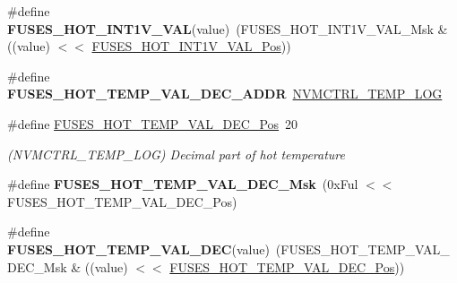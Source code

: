 \begin{DoxyCompactItemize}
\item 
\hypertarget{group__fuses__api_ga9eae2f7180bca01956d574c35ed687b4}{}\#define {\bfseries F\+U\+S\+E\+S\+\_\+\+H\+O\+T\+\_\+\+I\+N\+T1\+V\+\_\+\+V\+A\+L}(value)~(F\+U\+S\+E\+S\+\_\+\+H\+O\+T\+\_\+\+I\+N\+T1\+V\+\_\+\+V\+A\+L\+\_\+\+Msk \& ((value) $<$$<$ \hyperlink{group__fuses__api_ga8b14f5897dd4c958cde93e08ee14ae2a}{F\+U\+S\+E\+S\+\_\+\+H\+O\+T\+\_\+\+I\+N\+T1\+V\+\_\+\+V\+A\+L\+\_\+\+Pos}))\label{group__fuses__api_ga9eae2f7180bca01956d574c35ed687b4}

\item 
\hypertarget{group__fuses__api_ga6254293b90a6ff46a97e70c99e03d22c}{}\#define {\bfseries F\+U\+S\+E\+S\+\_\+\+H\+O\+T\+\_\+\+T\+E\+M\+P\+\_\+\+V\+A\+L\+\_\+\+D\+E\+C\+\_\+\+A\+D\+D\+R}~\hyperlink{group___s_a_m_l21_j18_a__base_gae900d443ec6d7cf1c90d21b6662fa447}{N\+V\+M\+C\+T\+R\+L\+\_\+\+T\+E\+M\+P\+\_\+\+L\+O\+G}\label{group__fuses__api_ga6254293b90a6ff46a97e70c99e03d22c}

\item 
\hypertarget{group__fuses__api_gafc1b6bd9fd9cdb5f0a1e89d14bb6f100}{}\#define \hyperlink{group__fuses__api_gafc1b6bd9fd9cdb5f0a1e89d14bb6f100}{F\+U\+S\+E\+S\+\_\+\+H\+O\+T\+\_\+\+T\+E\+M\+P\+\_\+\+V\+A\+L\+\_\+\+D\+E\+C\+\_\+\+Pos}~20\label{group__fuses__api_gafc1b6bd9fd9cdb5f0a1e89d14bb6f100}

\begin{DoxyCompactList}\small\item\em (N\+V\+M\+C\+T\+R\+L\+\_\+\+T\+E\+M\+P\+\_\+\+L\+O\+G) Decimal part of hot temperature \end{DoxyCompactList}\item 
\hypertarget{group__fuses__api_ga005a50ddb15e176969d02e4ffed86fc4}{}\#define {\bfseries F\+U\+S\+E\+S\+\_\+\+H\+O\+T\+\_\+\+T\+E\+M\+P\+\_\+\+V\+A\+L\+\_\+\+D\+E\+C\+\_\+\+Msk}~(0x\+Ful $<$$<$ F\+U\+S\+E\+S\+\_\+\+H\+O\+T\+\_\+\+T\+E\+M\+P\+\_\+\+V\+A\+L\+\_\+\+D\+E\+C\+\_\+\+Pos)\label{group__fuses__api_ga005a50ddb15e176969d02e4ffed86fc4}

\item 
\hypertarget{group__fuses__api_ga9ba1cd0264201fcca71e4f8b91e126f4}{}\#define {\bfseries F\+U\+S\+E\+S\+\_\+\+H\+O\+T\+\_\+\+T\+E\+M\+P\+\_\+\+V\+A\+L\+\_\+\+D\+E\+C}(value)~(F\+U\+S\+E\+S\+\_\+\+H\+O\+T\+\_\+\+T\+E\+M\+P\+\_\+\+V\+A\+L\+\_\+\+D\+E\+C\+\_\+\+Msk \& ((value) $<$$<$ \hyperlink{group__fuses__api_gafc1b6bd9fd9cdb5f0a1e89d14bb6f100}{F\+U\+S\+E\+S\+\_\+\+H\+O\+T\+\_\+\+T\+E\+M\+P\+\_\+\+V\+A\+L\+\_\+\+D\+E\+C\+\_\+\+Pos}))\label{group__fuses__api_ga9ba1cd0264201fcca71e4f8b91e126f4}


\end{DoxyCompactItemize}
